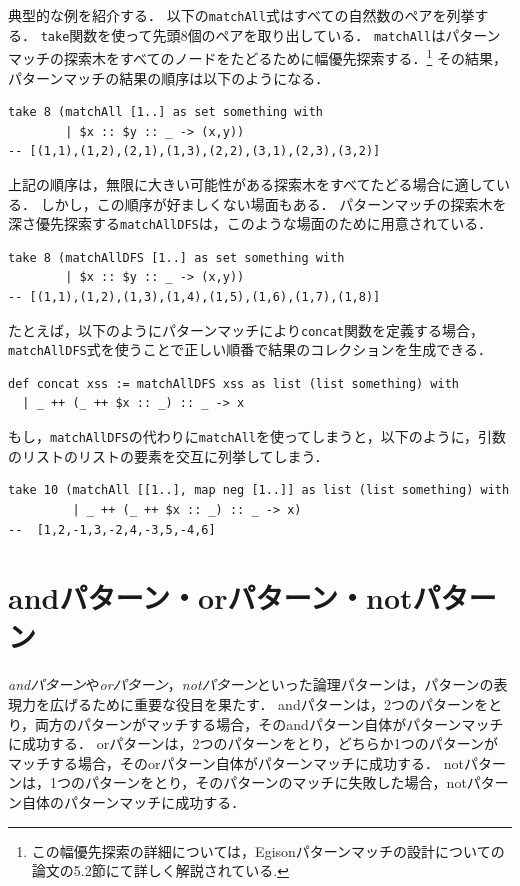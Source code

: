 典型的な例を紹介する．
以下の\lstinline{matchAll}式はすべての自然数のペアを列挙する．
\lstinline{take}関数を使って先頭$8$個のペアを取り出している．
\lstinline{matchAll}はパターンマッチの探索木をすべてのノードをたどるために幅優先探索する．\footnote{この幅優先探索の詳細については，Egisonパターンマッチの設計についての論文\cite{egi2018Aplas}の5.2節にて詳しく解説されている.}
その結果，パターンマッチの結果の順序は以下のようになる．
\begin{lstlisting}[language=egison,numbers=none]
take 8 (matchAll [1..] as set something with
        | $x :: $y :: _ -> (x,y))
-- [(1,1),(1,2),(2,1),(1,3),(2,2),(3,1),(2,3),(3,2)]
\end{lstlisting}
上記の順序は，無限に大きい可能性がある探索木をすべてたどる場合に適している．
しかし，この順序が好ましくない場面もある．
パターンマッチの探索木を深さ優先探索する\lstinline{matchAllDFS}は，このような場面のために用意されている．
\begin{lstlisting}[language=egison,numbers=none]
take 8 (matchAllDFS [1..] as set something with
        | $x :: $y :: _ -> (x,y))
-- [(1,1),(1,2),(1,3),(1,4),(1,5),(1,6),(1,7),(1,8)]
\end{lstlisting}
たとえば，以下のようにパターンマッチにより\lstinline{concat}関数を定義する場合，\lstinline{matchAllDFS}式を使うことで正しい順番で結果のコレクションを生成できる．
\begin{lstlisting}[language=egison,numbers=none]
def concat xss := matchAllDFS xss as list (list something) with
  | _ ++ (_ ++ $x :: _) :: _ -> x
\end{lstlisting}
もし，\lstinline{matchAllDFS}の代わりに\lstinline{matchAll}を使ってしまうと，以下のように，引数のリストのリストの要素を交互に列挙してしまう．
\begin{lstlisting}[language=egison,numbers=none]
take 10 (matchAll [[1..], map neg [1..]] as list (list something) with
         | _ ++ (_ ++ $x :: _) :: _ -> x)
--  [1,2,-1,3,-2,4,-3,5,-4,6]
\end{lstlisting}


\section{andパターン・orパターン・notパターン}\label{quick-logical-pat}

\emph{andパターン}や\emph{orパターン}，\emph{notパターン}といった論理パターンは，パターンの表現力を広げるために重要な役目を果たす．
andパターンは，2つのパターンをとり，両方のパターンがマッチする場合，そのandパターン自体がパターンマッチに成功する．
orパターンは，2つのパターンをとり，どちらか1つのパターンがマッチする場合，そのorパターン自体がパターンマッチに成功する．
notパターンは，1つのパターンをとり，そのパターンのマッチに失敗した場合，notパターン自体のパターンマッチに成功する．

